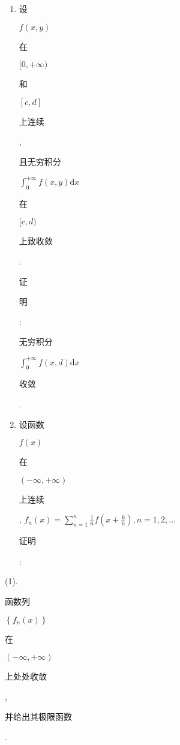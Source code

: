 \documentclass[10pt]{article}
\begin{document}
\begin{enumerate}
  \item \begin{CJK}{UTF8}{mj}设\end{CJK} $f(x, y)$ \begin{CJK}{UTF8}{mj}在\end{CJK} $[0,+\infty)$ \begin{CJK}{UTF8}{mj}和\end{CJK} $[c, d]$ \begin{CJK}{UTF8}{mj}上连续\end{CJK}, \begin{CJK}{UTF8}{mj}且无穷积分\end{CJK} $\int_{0}^{+\infty} f(x, y) \mathrm{d} x$ \begin{CJK}{UTF8}{mj}在\end{CJK} $[c, d)$ \begin{CJK}{UTF8}{mj}上致收敛\end{CJK}. \begin{CJK}{UTF8}{mj}证\end{CJK} \begin{CJK}{UTF8}{mj}明\end{CJK}: \begin{CJK}{UTF8}{mj}无穷积分\end{CJK} $\int_{0}^{+\infty} f(x, d) \mathrm{d} x$ \begin{CJK}{UTF8}{mj}收敛\end{CJK}.

  \item \begin{CJK}{UTF8}{mj}设函数\end{CJK} $f(x)$ \begin{CJK}{UTF8}{mj}在\end{CJK} $(-\infty,+\infty)$ \begin{CJK}{UTF8}{mj}上连续\end{CJK}, $f_{n}(x)=\sum_{n=1}^{n} \frac{1}{n} f\left(x+\frac{k}{n}\right), n=1,2, \ldots$ \begin{CJK}{UTF8}{mj}证明\end{CJK}:

\end{enumerate}
(1). \begin{CJK}{UTF8}{mj}函数列\end{CJK} $\left\{f_{n}(x)\right\}$ \begin{CJK}{UTF8}{mj}在\end{CJK} $(-\infty,+\infty)$ \begin{CJK}{UTF8}{mj}上处处收敛\end{CJK}, \begin{CJK}{UTF8}{mj}并给出其极限函数\end{CJK}.
\end{document}
